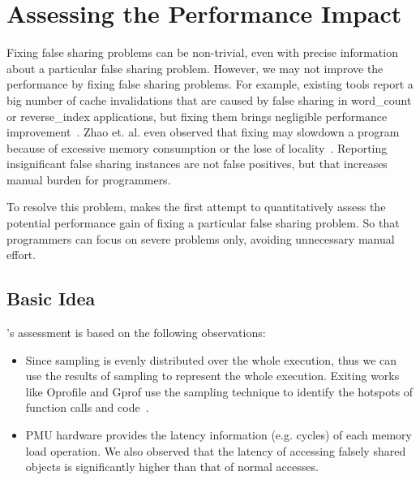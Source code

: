 \section{Assessing the Performance Impact}

\label{sec:predictimprove}

Fixing false sharing problems can be non-trivial, even with precise information about a particular false sharing problem. However, we may not improve the performance by fixing false sharing problems. For example, existing tools report a big number of cache invalidations that are caused by false sharing in word\_count or reverse\_index applications, but fixing them brings negligible performance improvement~\cite{Sheriff, Predator}. Zhao et. al. even observed that fixing may slowdown a program because of excessive memory consumption or the lose of locality~\cite{qinzhao}. Reporting insignificant false sharing instances are not false positives, but that increases manual burden for programmers.

To resolve this problem, \cheetah{} makes the first attempt to quantitatively assess the potential performance gain of fixing a particular false sharing problem. So that programmers can focus on severe problems only, avoiding unnecessary manual effort.

\subsection{Basic Idea}

\cheetah{}'s assessment is based on the following observations:

\begin{itemize}
\item Since sampling is evenly distributed over the whole execution, thus we can use the results of sampling to represent the whole execution. Exiting works like Oprofile and Gprof use the sampling technique to identify the hotspots of function calls and code~\cite{oprofile, DBLP:conf/sigplan/GrahamKM82}.

\item PMU hardware provides the latency information (e.g. cycles) of each memory load operation. We also observed that the latency of accessing falsely shared objects is significantly higher than that of normal accesses. 

\end{itemize}

